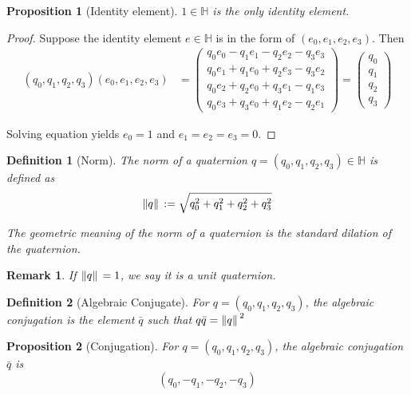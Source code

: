 \documentclass[12pt]{article}
\newtheorem*{definition}{Definition}
\newtheorem*{proposition}{Proposition}
\newtheorem*{remark}{Remark}
\begin{document}
    \begin{proposition}[Identity element]
        $1\in\mathbb{H}$ is the only identity element.
    \end{proposition}

    \begin{proof}
        Suppose the identity element $e\in\mathbb{H}$ is in the form of $(e_0,e_1,e_2,e_3)$. Then \begin{align*}
            (q_0,q_1,q_2,q_3)(e_0,e_1,e_2,e_3)&=\begin{pmatrix}
                q_0e_0-q_1e_1-q_2e_2-q_3e_3\\
                q_0e_1+q_1e_0+q_2e_3-q_3e_2\\
                q_0e_2+q_2e_0+q_3e_1-q_1e_3\\
                q_0e_3+q_3e_0+q_1e_2-q_2e_1
            \end{pmatrix}
            =\begin{pmatrix}
                q_0\\q_1\\q_2\\q_3
            \end{pmatrix}
        \end{align*}

        Solving equation yields $e_0=1$ and $e_1=e_2=e_3=0$.
    \end{proof}

    \begin{definition}[Norm]
        The norm of a quaternion $q=(q_0,q_1,q_2,q_3)\in\mathbb{H}$ is defined as $$\norm*{q}:=\sqrt{q_0^2+q_1^2+q_2^2+q_3^2}$$

        The geometric meaning of the norm of a quaternion is the standard dilation of the quaternion.
    \end{definition}

    \begin{remark}
        If $\norm*{q}=1$, we say it is a unit quaternion.
    \end{remark}

    \begin{definition}[Algebraic Conjugate]
        For $q=(q_0,q_1,q_2,q_3)$, the algebraic conjugation is the element $\bar{q}$ such that $q\bar{q}=\norm*{q}^2$
    \end{definition}

    \begin{proposition}[Conjugation]
        For $q=(q_0,q_1,q_2,q_3)$, the algebraic conjugation $\bar{q}$ is $$(q_0,-q_1,-q_2,-q_3)$$
    \end{proposition}
\end{document}
